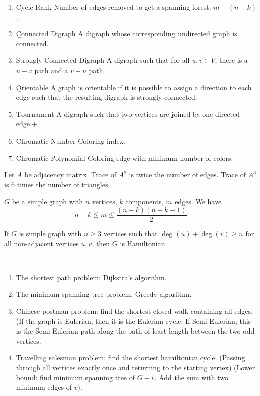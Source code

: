 \documentclass[12pt]{article}
\begin{document}
\begin{definition}[Graph]
\begin{enumerate}
		\item	\b{Cycle Rank} Number of edges removed to get a spanning forest. $m - (n-k)$.
		\item	\b{Connected Digraph} A digraph whose corresponding undirected graph is connected.
		\item	\b{Strongly Connected Digraph} A digraph such that for all $u,v \in V$, there is a $u-v$ path and a $v-u$ path.
		\item	\b{Orientable} A graph is orientable if it is possible to assign a direction to each edge such that the resulting digraph is strongly connected.
		\item	\b{Tournament} A digraph such that two vertices are joined by one directed edge.+
		\item	\b{Chromatic Number} Coloring index.
		\item	\b{Chromatic Polynomial} Coloring edge with minimum number of colors.
	\end{enumerate}
\end{definition}

\begin{theorem}
	Let $A$ be adjacency matrix.
	Trace of $A^2$ is twice the number of edges. Trace of $A^3$ is 6 times the number of triangles.
\end{theorem}

\begin{theorem}
	$G$ be a simple graph with $n$ vertices, $k$ components, $m$ edges. We have 
	\[ 
		n-k \leq m \leq \frac{(n-k)(n-k+1)}{2}
	\]
\end{theorem}

\begin{theorem}[Ore]
If $G$ is simple graph with $n \geq 3$ vertices such that $\deg (u) + \deg (v) \geq n$ for all non-adjacent vertices $u,v$, then $G$ is Hamiltonian.
\end{theorem}

\begin{definition}[Algorithms]
	\ 
\begin{enumerate}
	\item The shortest path problem: Dijkstra's algorithm.
	\item The minimum spanning tree problem: Greedy algorithm.
	\item Chinese postman problem: find the shortest closed walk containing all edges. (If the graph is Eulerian, then it is the Eulerian cycle. If Semi-Eulerian, this is the Semi-Eulerian path along the path of least length between the two odd vertices.
	\item Travelling salesman problem: find the shortest hamiltonian cycle. (Passing through all vertices exactly once and returning to the starting vertex) (Lower bound: find minimum spanning tree of $G - v$. Add the sum with two minimum edges of $v$).
\end{enumerate}
\end{definition}
\end{document}
